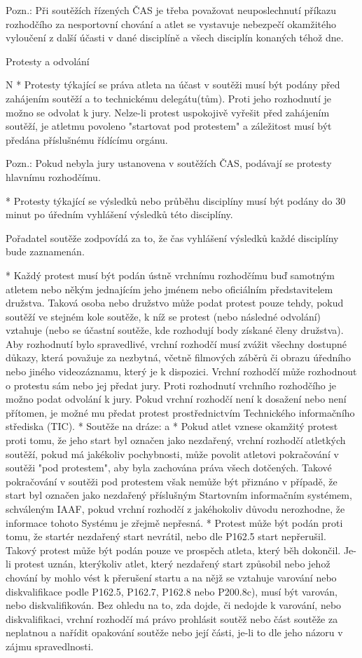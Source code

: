 Pozn.: Při soutěžích řízených ČAS je třeba považovat neuposlechnutí příkazu rozhodčího za nesportovní chování a atlet se vystavuje nebezpečí okamžitého vyloučení z další účasti v dané disciplíně a všech disciplín konaných téhož dne.
\enditems

\secc Protesty a odvolání

\begitems \style N
* Protesty týkající se práva atleta na účast v soutěži musí být podány před zahájením soutěží a to technickému delegátu(tům). Proti jeho rozhodnutí je možno se odvolat k jury. Nelze-li protest uspokojivě vyřešit před zahájením soutěží, je atletmu povoleno "startovat pod protestem" a záležitost musí být předána příslušnému řídícímu orgánu.

Pozn.: Pokud nebyla jury ustanovena v soutěžích ČAS, podávají se protesty hlavnímu rozhodčímu.

* Protesty týkající se výsledků nebo průběhu disciplíny musí být podány do 30 minut po úředním vyhlášení výsledků této disciplíny.

Pořadatel soutěže zodpovídá za to, že čas vyhlášení výsledků každé disciplíny bude zaznamenán.

* Každý protest musí být podán ústně vrchnímu rozhodčímu buď samotným atletem nebo někým jednajícím jeho jménem nebo oficiálním představitelem družstva. Taková osoba nebo družstvo může podat protest pouze tehdy, pokud soutěží ve stejném kole soutěže, k níž se protest (nebo následné odvolání) vztahuje (nebo se účastní soutěže, kde rozhodují body získané členy družstva). Aby rozhodnutí bylo spravedlivé, vrchní rozhodčí musí zvážit všechny dostupné důkazy, která považuje za nezbytná, včetně filmových záběrů či obrazu úředního nebo jiného videozáznamu, který je k dispozici. Vrchní rozhodčí může rozhodnout o protestu sám nebo jej předat jury. Proti rozhodnutí vrchního rozhodčího je možno podat odvolání k jury. Pokud vrchní rozhodčí není k dosažení nebo není přítomen, je možné mu předat protest prostřednictvím Technického informačního střediska (TIC).
* Soutěže na dráze:
  \begitems \style a
  * Pokud atlet vznese okamžitý protest proti tomu, že jeho start byl označen jako nezdařený, vrchní rozhodčí atletkých soutěží, pokud má jakékoliv pochybnosti, může povolit atletovi pokračování v soutěži "pod protestem", aby byla zachována práva všech dotčených. Takové pokračování v soutěži pod protestem však nemůže být přiznáno v případě, že start byl označen jako nezdařený příslušným Startovním informačním systémem, schváleným IAAF, pokud vrchní rozhodčí z jakéhokoliv důvodu nerozhodne, že informace tohoto Systému je zřejmě nepřesná.
  * Protest může být podán proti tomu, že startér nezdařený start nevrátil, nebo dle P162.5 start nepřerušil. Takový protest může být podán pouze ve prospěch atleta, který běh dokončil. Je-li protest uznán, kterýkoliv atlet, který nezdařený start způsobil nebo jehož chování by mohlo vést k přerušení startu a na nějž se vztahuje varování nebo diskvalifikace podle P162.5, P162.7, P162.8 nebo P200.8c), musí být varován, nebo diskvalifikován. Bez ohledu na to, zda dojde, či nedojde k varování, nebo diskvalifikaci, vrchní rozhodčí má právo prohlásit soutěž nebo část soutěže za neplatnou a nařídit opakování soutěže nebo její části, je-li to dle jeho názoru v zájmu spravedlnosti.

